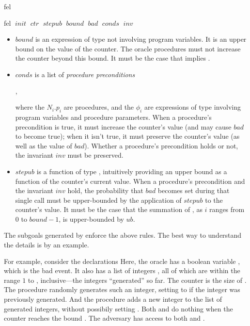 \begin{tactic}{fel}
\begin{tsyntax}{fel $\;\mathit{init}$ $\;\mathit{ctr}$ $\;\mathit{stepub}$
                      $\;\mathit{bound}$ $\;\mathit{bad}$ $\;\mathit{conds}$
                      $\;\mathit{inv}$}
\begin{itemize}
    \item $\mathit{bound}$ is an expression of type  not
      involving program variables. It is an upper bound on the value
      of the counter. The oracle procedures must not increase the
      counter beyond this bound. It must be the case that
      implies .

    \item $\mathit{conds}$ is a list of \emph{procedure preconditions}
      \begin{center}
        ,
      \end{center}
      where the $N_i$.$p_i$ are procedures, and the $\phi_i$ are
      expressions of type  involving program variables and
      procedure parameters.  When a procedure's precondition is true,
      it must increase the counter's value (and may cause
      $\mathit{bad}$ to become true); when it isn't true, it must
      preserve the counter's value (as well as the value of
      $\mathit{bad}$). Whether a procedure's precondition holds or not,
      the invariant $\mathit{inv}$ must be preserved.

    \item $\mathit{stepub}$ is a function of type ,
      intuitively providing an upper bound as a function of the
      counter's current value. When a procedure's precondition and the
      invariant $\mathit{inv}$ hold, the probability that
      $\mathit{bad}$ becomes set during that single call must be
      upper-bounded by the application of $\mathit{stepub}$ to the
      counter's value.  It must be the case that the summation of
      , as $i$ ranges from $0$ to
      $\mathit{bound} - 1$, is upper-bounded by $\mathit{ub}$.

    \end{itemize}
    The subgoals generated by  enforce the above rules. The
    best way to understand the details is by an example.

    \medskip For example, consider the declarations
     Here, the oracle has
    a boolean variable , which is the bad event. It also has a
    list of integers , all of which are within the range $1$
    to , inclusive---the integers ``generated'' so far. The
    counter is the size of . The procedure  randomly
    generates such an integer, setting  to  if the
    integer was previously generated. And the procedure  adds
    a new integer to the list of generated integers, without possibily
    setting . Both  and  do nothing when the
    counter reaches the bound .  The adversary has access to both
     and .


\end{tsyntax}
\end{tactic}
